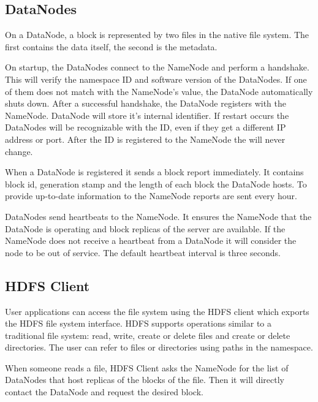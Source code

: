\subsection{DataNodes \cite{Shvachko:2010:HDF:1913798.1914427}}
On a DataNode, a block is represented by two files in the native file system. The first contains the data itself, the second is the metadata.

On startup, the DataNodes connect to the NameNode and perform a handshake. This will verify the namespace ID and software version of the DataNodes. If one of them does not match with the NameNode's value, the DataNode automatically shuts down. After a successful handshake, the DataNode registers with the NameNode. DataNode will store it's internal identifier. If restart occurs the DataNodes will be recognizable with the ID, even if they get a different IP address or port. After the ID is registered to the NameNode the will never change. 

 When a DataNode is registered it sends a block report immediately. It contains block id, generation stamp and the length of each block the DataNode hosts. To provide up-to-date information to the NameNode reports are sent every hour. 

DataNodes send heartbeats to the NameNode. It ensures the NameNode that the DataNode is operating and block replicas of the server are available. If the NameNode does not receive a heartbeat from a DataNode it will consider the node to be out of service. The default heartbeat interval is three seconds.

\subsection{HDFS Client \cite{Shvachko:2010:HDF:1913798.1914427}}
User applications can access the file system using the HDFS client which exports the HDFS file system interface. HDFS supports operations similar to a traditional file system: read, write, create or delete files and create or delete directories. The user can refer to files or directories using paths in the namespace.

When someone reads a file, HDFS Client asks the NameNode for the list of DataNodes that host replicas of the blocks of the file. Then it will directly contact the DataNode and request the desired block.

